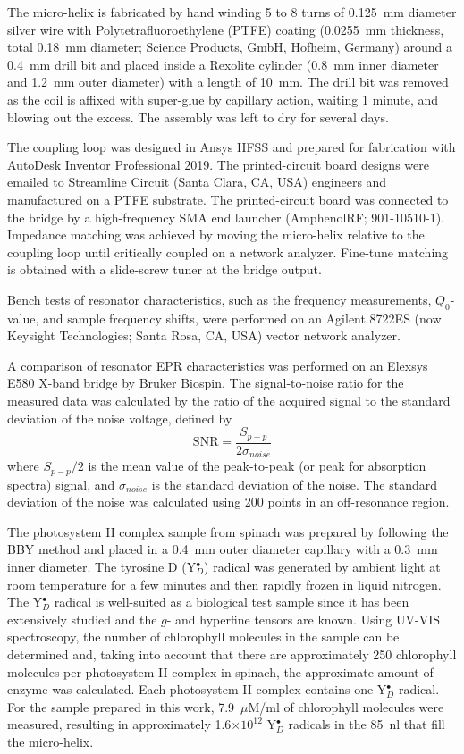 The micro-helix is fabricated by hand winding 5 to 8 turns of 0.125~mm diameter silver wire with Polytetrafluoroethylene (PTFE) coating (0.0255~mm thickness, total 0.18~mm diameter; Science Products, GmbH, Hofheim, Germany) around a 0.4~mm drill bit and placed inside a Rexolite cylinder (0.8~mm inner diameter and 1.2~mm outer diameter) with a length of 10~mm. The drill bit was removed as the coil is affixed with super-glue by capillary action, waiting 1 minute, and blowing out the excess. The assembly was left to dry for several days. 

The coupling loop was designed in Ansys HFSS and prepared for fabrication with AutoDesk Inventor Professional 2019. The printed-circuit board designs were emailed to Streamline Circuit (Santa Clara, CA, USA) engineers and manufactured on a PTFE substrate. The printed-circuit board was connected to the bridge by a high-frequency SMA end launcher (AmphenolRF; 901-10510-1). Impedance matching was achieved by moving the micro-helix relative to the coupling loop until critically coupled on a network analyzer. Fine-tune matching is obtained with a slide-screw tuner at the bridge output. 

Bench tests of resonator characteristics, such as the frequency measurements, $Q_0$-value, and sample frequency shifts, were performed on an Agilent 8722ES (now Keysight Technologies; Santa Rosa, CA, USA) vector network analyzer.

A comparison of resonator EPR characteristics was performed on an Elexsys E580 X-band bridge by Bruker Biospin. The signal-to-noise ratio for the measured data was calculated by the ratio of the acquired signal to the standard deviation of the noise voltage, defined by
\begin{equation}
 \text{SNR}=\frac{S_{p\!-\!p}}{2\sigma_{noise}}
\end{equation}
where $S_{p\!-\!p}/2$ is the mean value of the peak-to-peak (or peak for absorption spectra) signal, and $\sigma_{noise}$ is the standard deviation of the noise. \cite{schroeder2000astronomical, oppenheim1999discrete} The standard deviation of the noise was calculated using 200 points in an off-resonance region.

The photosystem II complex sample from spinach was prepared by following the BBY method and placed in a 0.4~mm outer diameter capillary with a 0.3~mm inner diameter. \cite{BBY1981} The tyrosine D (Y$_D^\bullet$) radical was generated by ambient light at room temperature for a few minutes and then rapidly frozen in liquid nitrogen. The Y$_D^\bullet$ radical is well-suited as a biological test sample since it has been extensively studied and the $g$- and hyperfine tensors are known. \cite{Hofbauer6623} Using UV-VIS spectroscopy, the number of chlorophyll molecules in the sample can be determined and, taking into account that there are approximately 250 chlorophyll molecules per photosystem II complex in spinach, the approximate amount of enzyme was calculated. Each photosystem II complex contains one Y$_D^\bullet$ radical. For the sample prepared in this work, 7.9~$\mu$M/ml of chlorophyll molecules were measured, resulting in approximately 1.6$\times10^{12}$ Y$_D^\bullet$ radicals in the 85~nl that fill the micro-helix. 

